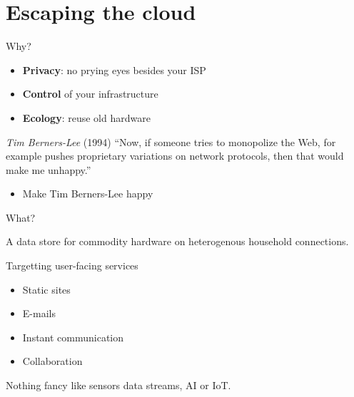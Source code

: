 \section{Escaping the cloud}





\begin{frame}{Why?}

\begin{itemize}
	\item \textbf{Privacy}: no prying eyes besides your ISP
	\item \textbf{Control} of your infrastructure
	\item \textbf{Ecology}: reuse old hardware
\end{itemize}

\vfill
\begin{block}{\emph{Tim Berners-Lee} (1994)}
``Now, if someone tries to monopolize the Web, for example pushes proprietary variations on network protocols, then that would make me unhappy.''
\end{block}

\begin{itemize}
	\item Make Tim Berners-Lee happy
\end{itemize}

\end{frame}


\begin{frame}{What?}

\centering\Large
A data store for commodity hardware on heterogenous household connections. 


\vfill\raggedright\normalsize


\begin{block}{Targetting user-facing services}
\begin{itemize}
	\item Static sites 
	\item E-mails
	\item Instant communication
	\item Collaboration 
\end{itemize}
\end{block}
\vfill

Nothing fancy like sensors data streams, AI or IoT.

\end{frame}


